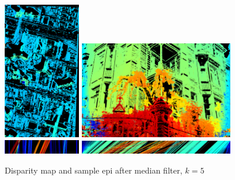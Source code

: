 \documentclass{article}
\theoremstyle{definition}
\begin{document}
\begin{figure}[ht]
  \centering
  \includegraphics[width=0.3\textwidth]{images/1520617477650_dmap.png}
  \includegraphics[width=0.6\textwidth]{images/1520618100513_dmap.png} \\
  
  \includegraphics[width=0.3\textwidth]{images/1520617477650_epi_colored.png}
  \includegraphics[width=0.6\textwidth]{images/1520618100513_epi_colored.png}
  \caption{Disparity map and sample epi after median filter, $k=5$}
  \label{fig:median:5}
\end{figure}
\end{document}
